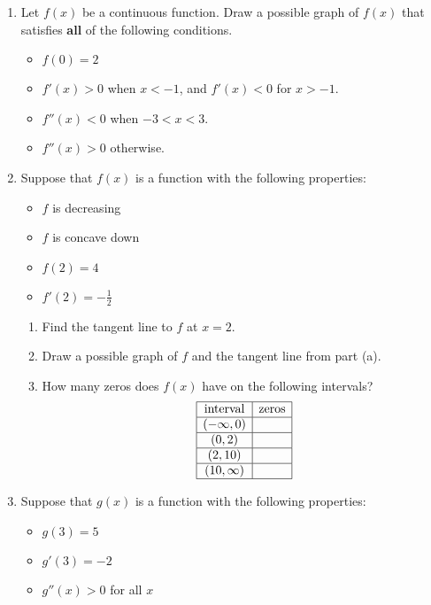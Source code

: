 \documentclass[11pt]{article}
\begin{document}
\begin{enumerate}
\item Let $f(x)$ be a continuous function.  Draw a possible graph of
  $f(x)$ that satisfies \textbf{all} of the following conditions.
 	\begin{itemize}
 	\item $f(0)=2$
 	\item $f'(x)> 0$ when $x<-1$, and $f'(x)< 0$ for $x>-1$.
 	\item $f''(x)<0$ when $-3 < x < 3$.
 	\item $f''(x)>0$ otherwise.
 	\end{itemize}
  \begin{center}
  \end{center}

\newpage
\item Suppose that $f(x)$ is a function with the following properties:
  \begin{itemize}
  \item $f$ is decreasing
  \item $f$ is concave down
  \item $f(2)=4$
  \item $f'(2)=-\frac{1}{2}$
  \end{itemize}

  \begin{enumerate}
  \item Find the tangent line to $f$ at $x=2$.
    \vfill
  \item Draw a possible graph of $f$ and the tangent line from part
    (a).
    \vfill
  \item How many zeros does $f(x)$ have on the following intervals?
   \[
     \begin{array}{|c|c|}
       \hline
       \mbox{interval} & \mbox{zeros}\\
       \hline
       (-\infty,0)&\\
       \hline
       (0,2)&\\
       \hline
       (2,10)&\\
       \hline
       (10,\infty)&\\
       \hline
     \end{array}
   \]
   \end{enumerate}
  \newpage
\item Suppose that $g(x)$ is a function with the following
   properties:
  \begin{itemize}
  \item $g(3)=5$
  \item $g'(3)=-2$
  \item $g''(x)>0$ for all $x$
  \end{itemize}


\end{enumerate}
\end{document}
